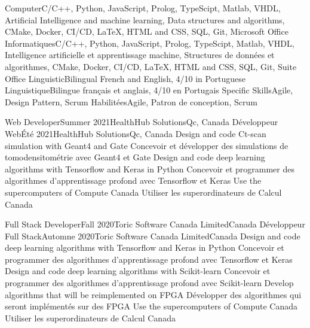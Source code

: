     \resumeEnumerationStart
        \resumeEnumerationEnFr
            {Computer}{C/C++, Python, JavaScript, Prolog, TypeScipt, Matlab, VHDL, Artificial Intelligence and machine learning, Data structures and algorithms, CMake, Docker, CI/CD, LaTeX, HTML and CSS, SQL, Git, Microsoft Office}
            {Informatiques}{C/C++, Python, JavaScript, Prolog, TypeScipt, Matlab, VHDL, Intelligence artificielle et apprentissage machine, Structures de données et algorithmes, CMake, Docker, CI/CD, LaTeX, HTML and CSS, SQL, Git, Suite Office}
        \resumeEnumerationEnFr
            {Linguistic}{Bilingual French and English, 4/10 in Portuguese}
            {Linguistique}{Bilingue français et anglais, 4/10 en Portugais}
        \resumeEnumerationEnFr
            {Specific Skills}{Agile, Design Pattern, Scrum}
            {Habilitées}{Agile, Patron de conception, Scrum}
    \resumeEnumerationEnd


  \resumeSubHeadingListStart
    \resumeSubheadingEnFr
        {Web Developer}{Summer 2021}{HealthHub Solutions}{Qc, Canada}
        {Développeur Web}{Été 2021}{HealthHub Solutions}{Qc, Canada}
            \resumeItemListStart
                \resumeItemEnFr
                    {Design and code Ct-scan simulation with Geant4 and Gate}
                    {Concevoir et développer des simulations de tomodensitométrie avec Geant4 et Gate}
                \resumeItemEnFr
                    {Design and code deep learning algorithms with Tensorflow and Keras in Python}
                    {Concevoir et programmer des algorithmes d’apprentissage profond avec Tensorflow et Keras}
                \resumeItem
                    {Use the supercomputers of Compute Canada}
                    {Utiliser les superordinateurs de Calcul Canada}
            \resumeItemListEnd

    \resumeSubheadingEnFr
        {Full Stack Developer}{Fall 2020}{Toric Software Canada Limited}{Canada}
        {Développeur Full Stack}{Automne 2020}{Toric Software Canada Limited}{Canada}
            \resumeItemListStart
                \resumeItemEnFr
                    {Design and code deep learning algorithms with Tensorflow and Keras in Python}
                    {Concevoir et programmer des algorithmes d’apprentissage profond avec Tensorflow et Keras}
                \resumeItemEnFr
                    {Design and code deep learning algorithms with Scikit-learn}
                    {Concevoir et programmer des algorithmes d'apprentissage profond avec Scikit-learn}
                \resumeItemEnFr
                    {Develop algorithms that will be reimplemented on FPGA}
                    {Développer des algorithmes qui seront implémentés sur des FPGA}
                \resumeItemEnFr
                    {Use the supercomputers of Compute Canada}
                    {Utiliser les superordinateurs de Calcul Canada}
            \resumeItemListEnd
        
